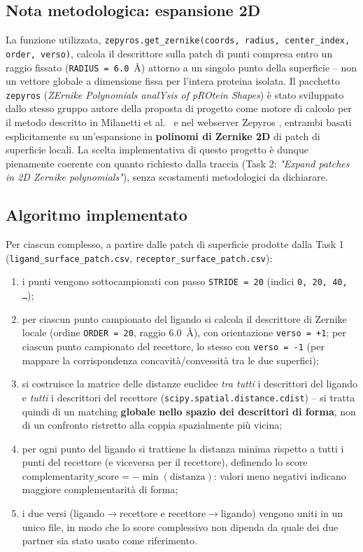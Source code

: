 \documentclass[11pt,a4paper]{article}
\begin{document}
\subsection{Nota metodologica: espansione 2D}
\label{sec:task2-2d3d}
La funzione utilizzata, \texttt{zepyros.get\_zernike(coords, radius, center\_index, order, verso)}, calcola il descrittore sulla patch di punti compresa entro un raggio fissato (\texttt{RADIUS = 6.0}~\r{A}) attorno a un singolo punto della superficie -- non un vettore globale a dimensione fissa per l'intera proteina isolata. Il pacchetto \texttt{zepyros} (\emph{ZErnike Polynomials analYsis of pROtein Shapes}) è stato sviluppato dallo stesso gruppo autore della proposta di progetto come motore di calcolo per il metodo descritto in Milanetti et al.~\cite{milanetti2021zernike2d} e nel webserver Zepyros \cite{miotto2025zepyros}, entrambi basati esplicitamente su un'espansione in \textbf{polinomi di Zernike 2D} di patch di superficie locali. La scelta implementativa di questo progetto è dunque pienamente coerente con quanto richiesto dalla traccia (Task 2: \emph{"Expand patches in 2D Zernike polynomials"}), senza scostamenti metodologici da dichiarare.
 
\subsection{Algoritmo implementato}
Per ciascun complesso, a partire dalle patch di superficie prodotte dalla Task 1 (\texttt{ligand\_surface\_patch.csv}, \texttt{receptor\_surface\_patch.csv}):
\begin{enumerate}
    \item i punti vengono sottocampionati con passo \texttt{STRIDE = 20} (indici \texttt{0, 20, 40, \dots});
    \item per ciascun punto campionato del ligando si calcola il descrittore di Zernike locale (ordine \texttt{ORDER = 20}, raggio 6.0~\r{A}), con orientazione \texttt{verso = +1}; per ciascun punto campionato del recettore, lo stesso con \texttt{verso = -1} (per mappare la corrispondenza concavità/convessità tra le due superfici);
    \item si costruisce la matrice delle distanze euclidee \emph{tra tutti} i descrittori del ligando e \emph{tutti} i descrittori del recettore (\texttt{scipy.spatial.distance.cdist}) -- si tratta quindi di un matching \textbf{globale nello spazio dei descrittori di forma}, non di un confronto ristretto alla coppia spazialmente più vicina;
    \item per ogni punto del ligando si trattiene la distanza minima rispetto a tutti i punti del recettore (e viceversa per il recettore), definendo lo score $\text{complementarity\_score} = -\min(\text{distanza})$: valori meno negativi indicano maggiore complementarità di forma;
    \item i due versi (ligando$\to$recettore e recettore$\to$ligando) vengono uniti in un unico file, in modo che lo score complessivo non dipenda da quale dei due partner sia stato usato come riferimento.
\end{enumerate}
\end{document}
